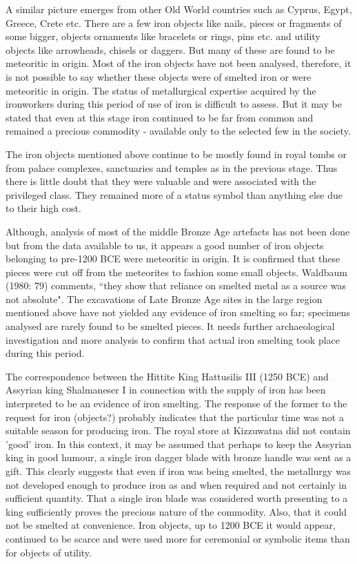{A similar picture emerges from other Old World countries such as Cyprus, Egypt, Greece, Crete etc. There are a few iron objects like nails, pieces or fragments of some bigger, objects ornaments like bracelets or rings, pins etc. and utility objects like arrowheads, chisels or daggers. But many of these are found to be meteoritic in origin. Most of the iron objects have not been analysed, therefore, it is not possible to say whether these objects were of smelted iron or were meteoritic in origin. The status of metallurgical expertise acquired by the ironworkers during this period of use of iron is difficult to assess. But it may be stated that even at this stage iron continued to be far from common and remained a precious commodity - available only to the selected few in the society.

The iron objects mentioned above continue to be mostly found in royal tombs or from palace complexes, sanctuaries and temples as in the previous stage. Thus there is little doubt that they were valuable and were associated with the privileged class. They remained more of a status symbol than anything else due to their high cost.

Although, analysis of most of the middle Bronze Age artefacts has not been done but from the data available to us, it appears a good number of iron objects belonging to pre-1200 BCE were meteoritic in origin. It is confirmed that these pieces were cut off from the meteorites to fashion some small objects. Waldbaum (1980: 79) comments, ``they show that reliance on smelted metal as a source was not absolute". The excavations of Late Bronze Age sites in the large region mentioned above have not yielded any evidence of iron smelting so far; specimens analysed are rarely found to be smelted pieces. It needs further archaeological investigation and more analysis to confirm that actual iron smelting took place during this period.

The correspondence between the Hittite King Hattusilis III (1250 BCE) and Assyrian king Shalmaneser I in connection with the supply of iron has been interpreted to be an evidence of iron smelting. The response of the former to the request for iron (objects?) probably indicates that the particular time was not a suitable season for producing iron. The royal store at Kizzuwatna did not contain 'good' iron. In this context, it may be assumed that perhaps to keep the Assyrian king in good humour, a single iron dagger blade with bronze handle was sent as a gift. This clearly suggests that even if iron was being smelted, the metallurgy was not developed enough to produce iron as and when required and not certainly in sufficient quantity. That a single iron blade was considered worth presenting to a king sufficiently proves the precious nature of the commodity. Also, that it could not be smelted at convenience. Iron objects, up to 1200 BCE it would appear, continued to be scarce and were used more for ceremonial or symbolic items than for objects of utility.

}
